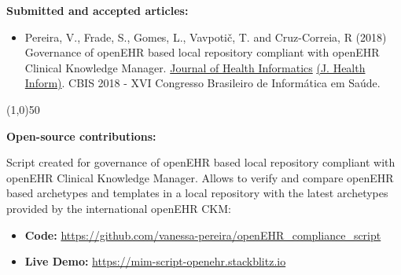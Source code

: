 \documentclass[mim_thesis.tex]{subfiles}
\begin{document}
\textbf{Submitted and accepted articles:}
\begin{itemize}
	\item Pereira, V., Frade, S., Gomes, L., Vavpotič, T. and Cruz-Correia, R (2018) Governance of openEHR based local repository compliant with openEHR Clinical Knowledge Manager. \underline{Journal of Health Informatics} \underline{(J. Health Inform)}. CBIS 2018 - XVI Congresso Brasileiro de Informática em Saúde.
\end{itemize}


\begin{center}
\line(1,0){50}
\end{center}

\textbf{Open-source contributions:}

Script created for governance of openEHR based local repository compliant with openEHR Clinical Knowledge Manager. Allows to verify and compare openEHR based archetypes and templates in a local repository with the latest archetypes provided by the international openEHR CKM:

    \begin{itemize} [noitemsep]
    \item \textbf{Code:} \url{https://github.com/vanessa-pereira/openEHR_compliance_script}        
    \item \textbf{Live Demo:} \url{https://mim-script-openehr.stackblitz.io}
    \end{itemize}
    
\end{document}
